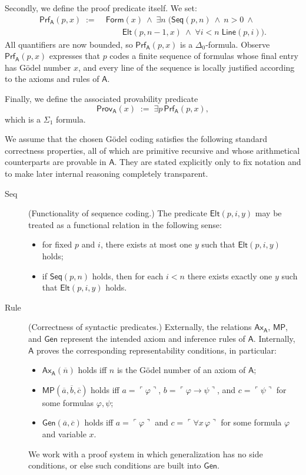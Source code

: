 \documentclass[reqno]{asl}
\makeatletter
\def\namedlabel#1#2{\begingroup
   \def\@currentlabel{#2}%
   \label{#1}\endgroup
}
\newcommand{\pa}{\textsf{A}}
\newcommand{\Prf}{\textsf{Prf}}
\newcommand{\Line}{\textsf{Line}}
\newcommand{\Form}{\textsf{Form}}
\newcommand{\Ax}{\textsf{Ax}}
\newcommand{\Seq}{\textsf{Seq}}
\newcommand{\MP}{\textsf{MP}}
\newcommand{\Gen}{\textsf{Gen}}
\newcommand{\Prov}{\textsf{Prov}}
\newcommand{\Elt}{\textsf{Elt}}
\makeatother
\begin{document}
Secondly, we define the proof predicate itself. We set:
\[
\begin{aligned}
\Prf_{\pa}(p,x)\;:=\;&
\Form(x)\ \wedge \; \exists n \;\Big(
\Seq(p,n)\ \wedge\
n>0\ \wedge\\
&\qquad
\Elt(p,n-1,x)\ \wedge \;
\forall i<n\;\Line(p,i)
\Big).
\end{aligned}
\]
All quantifiers are now bounded, so $\Prf_{\pa}(p,x)$ is a $\Delta_0$-formula. Observe $\Prf_{\pa}(p,x)$ expresses that $p$ codes a finite sequence of formulas whose final entry has G\"odel number $x$, and every line of the sequence is locally justified according to the axioms and rules of $\pa$.

Finally, we define the associated provability predicate
\[
\Prov_{\pa}(x)\;:=\;\exists p\,\Prf_{\pa}(p,x),
\]
which is a $\Sigma_1$ formula.
\medskip

We assume that the chosen G\"odel coding satisfies the following standard correctness properties, all of which are primitive recursive and whose arithmetical counterparts are provable in $\pa$. They are stated explicitly only to fix notation and to make later internal reasoning completely transparent.


\begin{description}
\item[Seq] \namedlabel{desc:functionality}{\textbf{Seq}} (Functionality of sequence coding.) 
The predicate $\Elt(p,i,y)$ may be treated as a functional relation in the following sense:
\begin{itemize}
\item for fixed $p$ and $i$, there exists at most one $y$ such that $\Elt(p,i,y)$ holds;
\item if $\Seq(p,n)$ holds, then for each $i<n$ there exists exactly one $y$ such that $\Elt(p,i,y)$ holds.
\end{itemize}

\item[Rule] \namedlabel{desc:correctness}{\textbf{Rule}} (Correctness of syntactic predicates.) 
Externally, the relations $\Ax_{\pa}$, $\MP$, and $\Gen$ represent the intended axiom and inference rules of $\pa$. Internally, $\pa$ proves the corresponding representability conditions, in particular:
\begin{itemize}
\item $\Ax_{\pa}(\overline{n})$ holds iff $n$ is the G\"odel number of an axiom of $\pa$;
\item $\MP(\overline{a},\overline{b},\overline{c})$ holds iff $a=\ulcorner\varphi\urcorner$, $b=\ulcorner\varphi\to\psi\urcorner$, and $c=\ulcorner\psi\urcorner$ for some formulas $\varphi,\psi$;
\item $\Gen(\overline{a},\overline{c})$ holds iff $a=\ulcorner\varphi\urcorner$ and $c=\ulcorner\forall x\,\varphi\urcorner$ for some formula $\varphi$ and variable $x$.
\end{itemize}
We work with a proof system in which generalization has no side conditions, or else such conditions are built into $\Gen$.
\end{description}
\medskip
\end{document}
